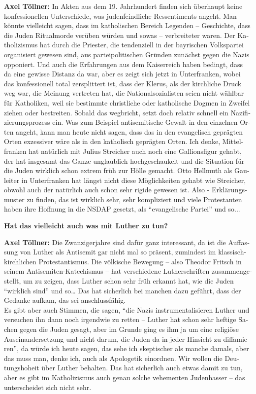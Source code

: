 \begin{otherlanguage}{ngerman}
\textbf{Axel Töllner:} In Akten aus dem 19. Jahrhundert finden sich überhaupt keine konfessionellen Unterschiede, was judenfeindliche Ressentiments angeht. Man könnte vielleicht sagen, dass im katholischen Bereich Legenden – Geschichte, dass die Juden Ritualmorde verüben würden und sowas – verbreiteter waren. 
Der Katholizismus hat durch die Priester, die tendenziell in der bayrischen Volkspartei organisiert gewesen sind, aus parteipolitischen Gründen zunächst gegen die Nazis opponiert. Und auch die Erfahrungen aus dem Kaiserreich haben bedingt, dass da eine gewisse Distanz da war, aber es zeigt sich jetzt in Unterfranken, wobei das konfessionell total zersplittert ist, dass der Klerus, als der kirchliche Druck weg war, die Meinung vertreten hat, die Nationalsozialisten seien nicht wählbar für Katholiken, weil sie bestimmte christliche oder katholische Dogmen in Zweifel ziehen oder bestreiten. Sobald das wegbricht, setzt doch relativ schnell ein Nazifizierungsprozess ein. Was zum Beispiel antisemitische Gewalt in den einzelnen Orten angeht, kann man heute nicht sagen, dass das in den evangelisch geprägten Orten exzessiver wäre als in den katholisch geprägten Orten. Ich denke, Mittelfranken hat natürlich mit Julius Streicher auch noch eine Gallionsfigur gehabt, der hat insgesamt das Ganze unglaublich hochgeschaukelt und die Situation für die Juden wirklich schon extrem früh zur Hölle gemacht. Otto Hellmuth als Gauleiter in Unterfranken hat längst nicht diese Möglichkeiten gehabt wie Streicher, obwohl auch der natürlich auch schon sehr rigide gewesen ist.  
Also - Erklärungsmuster zu finden, das ist wirklich sehr, sehr kompliziert und viele Protestanten haben ihre Hoffnung in die NSDAP gesetzt, als "`evangelische Partei"' und so... 

\textbf{Hat das vielleicht auch was mit Luther zu tun?} 

\textbf{Axel Töllner:} Die Zwanzigerjahre sind dafür ganz interessant, da ist die Auffassung von Luther als Antisemit gar nicht mal so präsent, zumindest im klassisch-kirchlichen Protestantismus.  
Die völkische Bewegung – also Theodor Fritsch in seinem Antisemiten-Katechismus – hat verschiedene Lutherschriften zusammengestellt, um zu zeigen, dass Luther schon sehr früh erkannt hat, wie die Juden "`wirklich sind"' und so… Das hat sicherlich bei manchen dazu geführt, dass der Gedanke aufkam, das sei anschlussfähig. \\
Es gibt aber auch Stimmen, die sagen, "`die Nazis instrumentalisieren Luther und versuchen ihn dann noch irgendwie zu retten – Luther hat schon sehr heftige Sachen gegen die Juden gesagt, aber im Grunde ging es ihm ja um eine religiöse Auseinandersetzung und nicht darum, die Juden da in jeder Hinsicht zu diffamieren"', da würde ich heute sagen, das sehe ich skeptischer als manche damals, aber das muss man, denke ich, auch als Apologetik einordnen. Wir wollen die Deutungshoheit über Luther behalten. Das hat sicherlich auch etwas damit zu tun, aber es gibt im Katholizismus auch genau solche vehementen Judenhasser – das unterscheidet sich nicht sehr. 


\end{otherlanguage}
